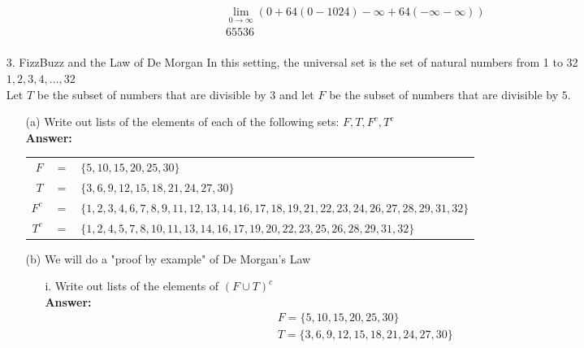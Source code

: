 \documentclass[a4paper]{article}
\begin{document}
\begin{itemize}
\begin{itemize}
\begin{equation}
\begin{split}
	      	      		\lim_{0\to\infty} (0 + 64(0 - 1024) - \infty + 64(-\infty - \infty)) \\
	      	      		65536 \\
	      	      	\end{split}
	      	      \end{equation}
	      \end{itemize}  
	\item[3.] FizzBuzz and the Law of De Morgan In this setting, the universal set is the set of natural numbers from 1 to 32 \\
	      ${1, 2, 3, 4, \ldots, 32}$ \\
	      Let $T$ be the subset of numbers that are divisible by $3$ and let $F$ be the subset of numbers that are divisible by $5$.
	      \begin{itemize}
	      	\item[(a)] Write out lists of the elements of each of the following sets: $F, T, F^{c}, T^{c}$ \\
	      	      \textbf{Answer:} 
	      	      \begin{tabular}{rcl}
	      	      	$F$     & $=$ & $\{5, 10, 15, 20, 25, 30\}$                                                                          \\
	      	      	$T$     & $=$ & $\{3, 6, 9, 12, 15, 18, 21, 24, 27, 30\}$                                                            \\
	      	      	$F^{c}$ & $=$ & $\{1, 2, 3, 4, 6, 7, 8, 9, 11, 12, 13, 14, 16, 17, 18, 19, 21, 22, 23, 24, 26, 27, 28, 29, 31, 32\}$ \\
	      	      	$T^{c}$ & $=$ & $\{1, 2, 4, 5, 7, 8, 10, 11, 13, 14, 16, 17, 19, 20, 22, 23, 25, 26, 28, 29, 31, 32\}$               \\
	      	      \end{tabular}
	      	\item[(b)] We will do a "proof by example" of De Morgan's Law
	      	      \begin{itemize}
	      	      	\item[i.] Write out lists of the elements of $(F \cup T)^{c}$ \\
	      	      	      \textbf{Answer:}
	      	      	      \begin{equation}
	      	      	      	\begin{split}
	      	      	      		F = \{5, 10, 15, 20, 25, 30\} \\
	      	      	      		T = \{3, 6, 9, 12, 15, 18, 21, 24, 27, 30\} \\

\end{split}
\end{equation}
\end{itemize}
\end{itemize}
\end{itemize}
\end{document}
